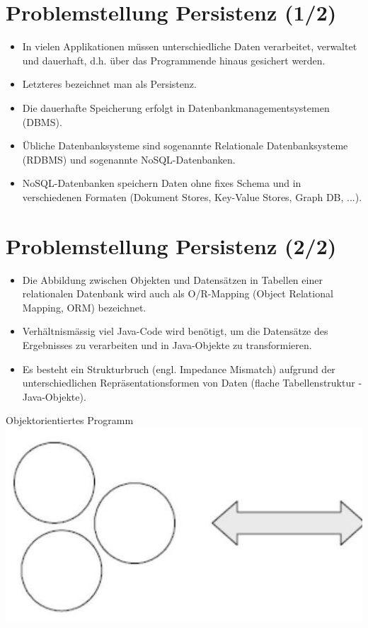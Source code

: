 \documentclass[10pt]{article}
\begin{document}
\section*{Problemstellung Persistenz (1/2)}
\begin{itemize}
  \item In vielen Applikationen müssen unterschiedliche Daten verarbeitet, verwaltet und dauerhaft, d.h. über das Programmende hinaus gesichert werden.
  \item Letzteres bezeichnet man als Persistenz.
  \item Die dauerhafte Speicherung erfolgt in Datenbankmanagementsystemen (DBMS).
  \item Übliche Datenbanksysteme sind sogenannte Relationale Datenbanksysteme (RDBMS) und sogenannte NoSQL-Datenbanken.
  \item NoSQL-Datenbanken speichern Daten ohne fixes Schema und in verschiedenen Formaten (Dokument Stores, Key-Value Stores, Graph DB, ...).
\end{itemize}

\section*{Problemstellung Persistenz (2/2)}
\begin{itemize}
  \item Die Abbildung zwischen Objekten und Datensätzen in Tabellen einer relationalen Datenbank wird auch als O/R-Mapping (Object Relational Mapping, ORM) bezeichnet.
  \item Verhältnismässig viel Java-Code wird benötigt, um die Datensätze des Ergebnisses zu verarbeiten und in Java-Objekte zu transformieren.
  \item Es besteht ein Strukturbruch (engl. Impedance Mismatch) aufgrund der unterschiedlichen Repräsentationsformen von Daten (flache Tabellenstruktur -Java-Objekte).
\end{itemize}

Objektorientiertes Programm\\
\includegraphics[max width=\textwidth, center]{2025_01_02_5ba1dc702e9f94ba8e06g-06}
\end{document}
